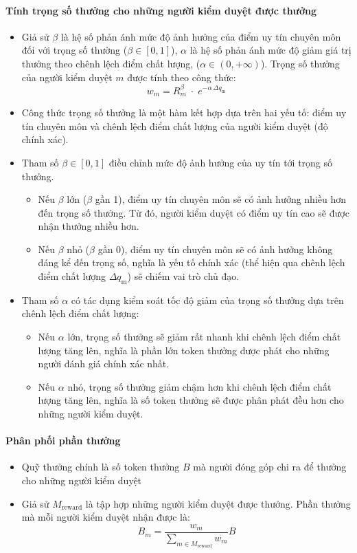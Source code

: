 \paragraph{Tính trọng số thưởng cho những người kiểm duyệt được thưởng}
\begin{itemize}
  \item Giả sử $\beta$ là hệ số phản ánh mức độ ảnh hưởng của điểm uy tín chuyên môn đối với trọng số thường ($\beta \in [0,1]$), $\alpha$ là hệ số phản ánh mức độ giảm giá trị thưởng theo chênh lệch điểm chất lượng, ($\alpha \in (0, +\infty)$). Trọng số thưởng của người kiểm duyệt $m$ được tính theo công thức:
        \[w_m = R_m^{\beta}\;\cdot\;e^{-\alpha\,\Delta q_{\text{m}}} \]

  \item Công thức trọng số thưởng là một hàm kết hợp dựa trên hai yếu tố: điểm uy tín chuyên môn và chênh lệch điểm chất lượng của người kiểm duyệt (độ chính xác).
  \item Tham số $\beta \in [0, 1]$ điều chỉnh mức độ ảnh hưởng của uy tín tới trọng số thưởng.
        \begin{itemize}
          \item Nếu $\beta$ lớn ($\beta$ gần 1), điểm uy tín chuyên môn sẽ có ảnh hưởng nhiều hơn đến trọng số thưởng. Từ đó, người kiểm duyệt có điểm uy tín cao sẽ được nhận thưởng nhiều hơn.
          \item Nếu $\beta$ nhỏ ($\beta$ gần 0), điểm uy tín chuyên môn sẽ có ảnh hưởng không đáng kể đến trọng số, nghĩa là yếu tố chính xác (thể hiện qua chênh lệch điểm chất lượng $\Delta q_{\text{m}}$) sẽ chiếm vai trò chủ đạo.
        \end{itemize}
  \item Tham số $\alpha$ có tác dụng kiểm soát tốc độ giảm của trọng số thưởng dựa trên chênh lệch điểm chất lượng:
        \begin{itemize}
          \item Nếu $\alpha$ lớn, trọng số thưởng sẽ giảm rất nhanh khi chênh lệch điểm chất lượng tăng lên, nghĩa là phần lớn token thưởng được phát cho những người đánh giá chính xác nhất.
          \item Nếu $\alpha$ nhỏ, trọng số thưởng giảm chậm hơn khi chênh lệch điểm chất lượng tăng lên, nghĩa là số token thưởng sẽ được phân phát đều hơn cho những người kiểm duyệt.
        \end{itemize}
\end{itemize}


\paragraph{Phân phối phần thưởng}
\begin{itemize}
  \item Quỹ thưởng chính là số token thưởng $B$ mà người đóng góp chi ra để thưởng cho những người kiểm duyệt
  \item Giả sử $M_{\text{reward}}$ là tập hợp những người kiểm duyệt được thưởng. Phần thưởng mà mỗi người kiểm duyệt nhận được là:
        \[B_m = \frac{w_m}{\displaystyle\sum_{m \in M_{\text{reward}}}w_m} B\]
\end{itemize}

